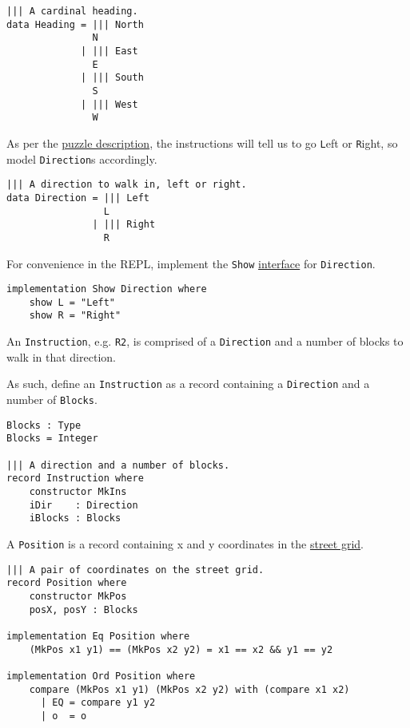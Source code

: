 \documentclass[b5paper,twoside]{amsbook}
\begin{document}
\begin{verbatim}
||| A cardinal heading.
data Heading = ||| North
               N
             | ||| East
               E
             | ||| South
               S
             | ||| West
               W
\end{verbatim}

As per the \href{no-time-for-a-taxicab}{puzzle description}, the
instructions will tell us to go \texttt{L}eft or
\texttt{R}ight, so model \texttt{Direction}s
accordingly.

\begin{verbatim}
||| A direction to walk in, left or right.
data Direction = ||| Left
                 L
               | ||| Right
                 R
\end{verbatim}

\newpage

For convenience in the REPL, implement the \texttt{Show}
\href{http://docs.idris-lang.org/en/latest/tutorial/interfaces.html}{interface}
for \texttt{Direction}.

\begin{verbatim}
implementation Show Direction where
    show L = "Left"
    show R = "Right"
\end{verbatim}

An \texttt{Instruction}, e.g. \texttt{R2}, is
comprised of a \texttt{Direction} and a number of blocks to
walk in that direction.

As such, define an \texttt{Instruction} as a record
containing a \texttt{Direction} and a number of
\texttt{Blocks}.

\begin{verbatim}
Blocks : Type
Blocks = Integer

||| A direction and a number of blocks.
record Instruction where
    constructor MkIns
    iDir    : Direction
    iBlocks : Blocks
\end{verbatim}

A \texttt{Position} is a record containing x and y
coordinates in the
\href{https://en.wikipedia.org/wiki/Taxicab_geometry}{street grid}.

\begin{verbatim}
||| A pair of coordinates on the street grid.
record Position where
    constructor MkPos
    posX, posY : Blocks

implementation Eq Position where
    (MkPos x1 y1) == (MkPos x2 y2) = x1 == x2 && y1 == y2

implementation Ord Position where
    compare (MkPos x1 y1) (MkPos x2 y2) with (compare x1 x2)
      | EQ = compare y1 y2
      | o  = o
\end{verbatim}
\end{document}
